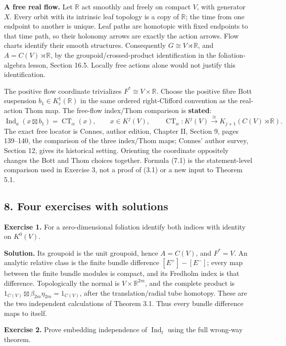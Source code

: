 \documentclass[
  11pt,
]{article}
\begin{document}
\textbf{A free real flow.} Let \(\mathbb R\) act smoothly and freely on
compact \(V\), with generator \(X\). Every orbit with its intrinsic leaf
topology is a copy of \(\mathbb R\); the time from one endpoint to
another is unique. Leaf paths are homotopic with fixed endpoints to that
time path, so their holonomy arrows are exactly the action arrows. Flow
charts identify their smooth structures. Consequently
\(G\cong V\rtimes\mathbb R\), and \(A=C(V)\rtimes\mathbb R\), by the
groupoid/crossed-product identification in the foliation-algebra lesson,
Section 16.5. Locally free actions alone would not justify this
identification.

The positive flow coordinate trivializes \(F^*\cong V\times\mathbb R\).
Choose the positive fibre Bott suspension \(b_1\in K_c^1(\mathbb R)\) in
the same ordered right-Clifford convention as the real-action Thom map.
The free-flow index/Thom comparison is \textbf{stated}: \[
 \operatorname{Ind}_a(x\boxtimes b_1)=\operatorname{CT}_\alpha(x),
 \qquad x\in K^j(V),\qquad
 \operatorname{CT}_\alpha:K^j(V)\xrightarrow{\cong}K_{j+1}(C(V)\rtimes\mathbb R).
 \tag{7.1}
\] The exact free locator is Connes, author edition, Chapter II, Section
9, pages 139--140, the comparison of the three index/Thom maps; Connes'
author survey, Section 12, gives its historical setting. Orienting the
coordinate oppositely changes the Bott and Thom choices together.
Formula (7.1) is the statement-level comparison used in Exercise 3, not
a proof of (3.1) or a new input to Theorem 5.1.

\subsection{8. Four exercises with
solutions}\label{four-exercises-with-solutions}

\textbf{Exercise 1.} For a zero-dimensional foliation identify both
indices with identity on \(K^0(V)\).

\textbf{Solution.} Its groupoid is the unit groupoid, hence \(A=C(V)\),
and \(F^*=V\). An analytic relative class is the finite bundle
difference \([E^+]-[E^-]\); every map between the finite bundle modules
is compact, and its Fredholm index is that difference. Topologically the
normal is \(V\times\mathbb R^{2m}\), and the complete product is
\(1_{C(V)}\boxtimes\beta_{2m}\eta_{2m}=1_{C(V)}\), after the
translation/radial tube homotopy. These are the two independent
calculations of Theorem 3.1. Thus every bundle difference maps to
itself.

\textbf{Exercise 2.} Prove embedding independence of
\(\operatorname{Ind}_t\) using the full wrong-way theorem.
\end{document}
